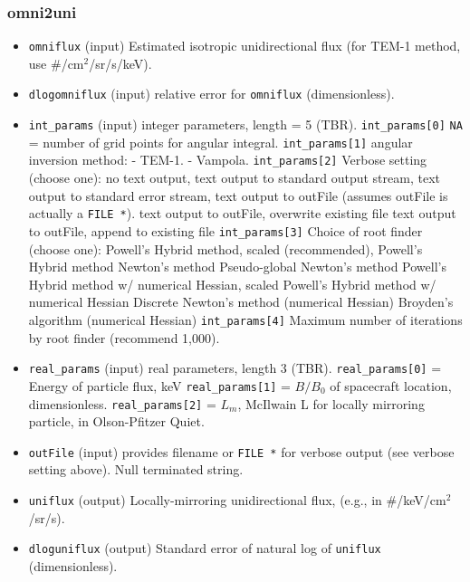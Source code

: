 \documentclass{article}    %
\begin{document}
\subsubsection{omni2uni}
\begin{itemize}
\item \verb|omniflux|  (input) Estimated isotropic unidirectional flux (for TEM-1 method, use \#/cm$^2$/sr/s/keV).
\item \verb|dlogomniflux| (input) relative error for \verb|omniflux| (dimensionless).
\item \verb|int_params| (input) integer parameters, length = 5 (TBR).
\subitem \verb|int_params[0]| \verb|NA| = number of grid points for angular integral.
\subitem \verb|int_params[1]| angular inversion method:
\subsubitem[-1] - TEM-1.
\subsubitem[-2] - Vampola.
\subitem \verb|int_params[2]| Verbose setting (choose one):
\subsubitem[0] no text output,
\subsubitem[1] text output to standard output stream,
\subsubitem[2] text output to standard error stream,
\subsubitem[3] text output to outFile (assumes outFile is actually a \verb|FILE *|).
\subsubitem[4] text output to outFile, overwrite existing file
\subsubitem[5] text output to outFile, append to existing file
\subitem \verb|int_params[3]| Choice of root finder (choose one):
\subsubitem[0] Powell's Hybrid method, scaled (recommended),
\subsubitem[1] Powell's Hybrid method
\subsubitem[2] Newton's method
\subsubitem[3] Pseudo-global Newton's method
\subsubitem[4] Powell's Hybrid method w/ numerical Hessian, scaled
\subsubitem[5] Powell's Hybrid method w/ numerical Hessian
\subsubitem[6] Discrete Newton's method  (numerical Hessian)
\subsubitem[7] Broyden's algorithm (numerical Hessian)
\subitem \verb|int_params[4]| Maximum number of iterations by root finder (recommend 1,000).
\item \verb|real_params| (input) real parameters, length 3 (TBR).
\subitem \verb|real_params[0]| = Energy of particle flux, keV
\subitem \verb|real_params[1]| = $B/B_0$ of spacecraft location, dimensionless.
\subitem \verb|real_params[2]| = $L_m$, McIlwain L for locally mirroring particle, in Olson-Pfitzer Quiet.
\item \verb|outFile| (input) provides filename or \verb|FILE *| for verbose output (see verbose setting above). Null terminated string.
\item \verb|uniflux| (output) Locally-mirroring unidirectional flux, (e.g., in \#/keV/cm$^2$/sr/s).
\item \verb|dloguniflux| (output) Standard error of natural log of \verb|uniflux| (dimensionless).
\end{itemize}
\end{document}
